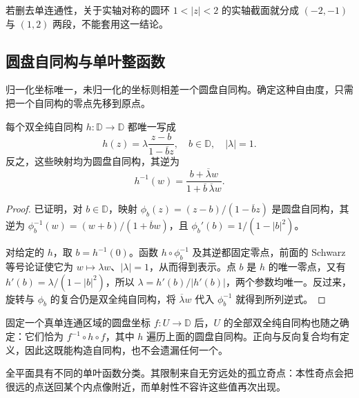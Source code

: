 若删去单连通性，关于实轴对称的圆环 \(1<|z|<2\) 的实轴截面就分成 \((-2,-1)\) 与 \((1,2)\) 两段，不能套用这一结论。

\subsection{圆盘自同构与单叶整函数}
\label{b3:subsec:050303}

归一化坐标唯一，未归一化的坐标则相差一个圆盘自同构。确定这种自由度，只需把一个自同构的零点先移到原点。

\begin{proposition}[圆盘自同构]\label{b3:prop:05-disk-automorphisms}
每个双全纯自同构 \(h:\mathbb D\rightarrow\mathbb D\) 都唯一写成
\[
 h(z)=\lambda\frac{z-b}{1-\overline b z},
 \quad b\in\mathbb D,\quad |\lambda|=1.
\]
反之，这些映射均为圆盘自同构，其逆为
\[
 h^{-1}(w)=\frac{b+\overline\lambda w}
                  {1+\overline b\,\overline\lambda w}.
\]
\end{proposition}
\begin{proof}
已证明，对 \(b\in\mathbb D\)，映射 \(\phi_b(z)=(z-b)/(1-\overline b z)\) 是圆盘自同构，其逆为 \(\phi_b^{-1}(w)=(w+b)/(1+\overline b w)\)，且 \(\phi_b'(b)=1/(1-|b|^2)\)。

对给定的 \(h\)，取 \(b=h^{-1}(0)\)。函数 \(h\circ\phi_b^{-1}\) 及其逆都固定零点，前面的 Schwarz 等号论证使它为 \(w\mapsto\lambda w\)、\(|\lambda|=1\)，从而得到表示。点 \(b\) 是 \(h\) 的唯一零点，又有 \(h'(b)=\lambda/(1-|b|^2)\)，所以 \(\lambda=h'(b)/|h'(b)|\)，两个参数均唯一。反过来，旋转与 \(\phi_b\) 的复合仍是双全纯自同构，将 \(\overline\lambda w\) 代入 \(\phi_b^{-1}\) 就得到所列逆式。
\end{proof}

固定一个真单连通区域的圆盘坐标 \(f:U\rightarrow\mathbb D\) 后，\(U\) 的全部双全纯自同构也随之确定：它们恰为 \(f^{-1}\circ h\circ f\)，其中 \(h\) 遍历上面的圆盘自同构。正向与反向复合均有定义，因此这既能构造自同构，也不会遗漏任何一个。

\ProseParagraphBreak

全平面具有不同的单叶函数分类。其限制来自无穷远处的孤立奇点：本性奇点会把很远的点送回某个内点像附近，而单射性不容许这些值再次出现。

